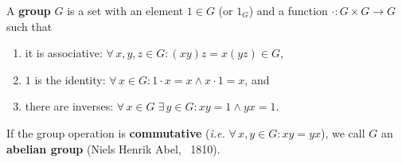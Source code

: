 \documentclass{notes}
\begin{document}
\begin{defn}
  A {\boldmath \bfseries group} $G$ is a set with an element $1 \in G$ (or $1_G$) and a function $\cdot \colon G \times G \to G$ such that 
  \begin{enumerate}
    \item it is associative: $\forall \, x, y, z \in G: (x y) z = x (y z) \in G$, 

    \item $1$ is the identity: $\forall \, x \in G: 1 \cdot x = x \wedge x \cdot 1 = x$, and 

    \item there are inverses: $\forall \, x \in G\; \exists \, y \in G: x y = 1 \wedge y x = 1$.
  \end{enumerate}

  If the group operation is {\boldmath \bfseries commutative} (\textit{i.e.} $\forall \, x, y \in G: x y = y x$), we call $G$ an {\boldmath \bfseries abelian group} (Niels Henrik Abel, ~1810).
\end{defn}
\end{document}
